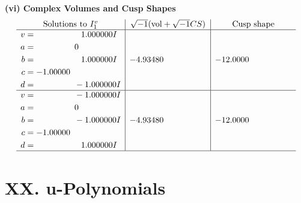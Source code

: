 \documentclass[1p]{elsarticle_modified}
\theoremstyle{definition}
\newcommand{\I}{\sqrt{-1}}
\begin{document}
\newpage\flushleft \textbf{(vi) Complex Volumes and Cusp Shapes}
$$\begin{array}{c|c|c}  
\text{Solutions to }I^v_{1}& \I (\text{vol} + \sqrt{-1}CS) & \text{Cusp shape}\\
 \hline 
\begin{aligned}
v &= \phantom{-0.000000 -}1.000000 I \\
a &= \phantom{-0.000000 } 0 \\
b &= \phantom{-0.000000 -}1.000000 I \\
c &= -1.00000\phantom{ +0.000000I} \\
d &= \phantom{-0.000000 } -1.000000 I\end{aligned}
 & -4.93480\phantom{ +0.000000I} & -12.0000\phantom{ +0.000000I} \\ \hline\begin{aligned}
v &= \phantom{-0.000000 } -1.000000 I \\
a &= \phantom{-0.000000 } 0 \\
b &= \phantom{-0.000000 } -1.000000 I \\
c &= -1.00000\phantom{ +0.000000I} \\
d &= \phantom{-0.000000 -}1.000000 I\end{aligned}
 & -4.93480\phantom{ +0.000000I} & -12.0000\phantom{ +0.000000I}\\
 \hline 
 \end{array}$$\newpage
\newpage\renewcommand{\arraystretch}{1}
\centering \section*{ XX. u-Polynomials}
\end{document}
